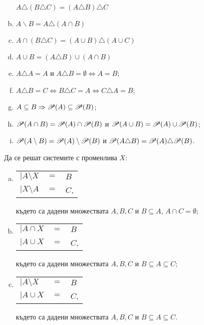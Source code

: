 \begin{problem}
\begin{enumerate}[a)]
    $A\triangle(B\triangle C) = (A\triangle B)\triangle C$
  \item
    $A\backslash B = A\triangle(A\cap B)$
  \item
    $A\cap(B\triangle C) = (A\cup B)\triangle(A\cup C)$
  \item
    $A\cup B = (A\triangle B)\cup(A\cap B)$
  \item
    $A\triangle A = A$ и $A\triangle B = \emptyset \iff A = B$;
  \item
    $A\triangle B = C \iff B\triangle C = A \iff C\triangle A = B$;
  \item 
    $A\subseteq B \Rightarrow \mathscr{P}(A) \subseteq \mathscr{P}(B)$;
  \item
    $\mathscr{P}(A\cap B) = \mathscr{P}(A) \cap \mathscr{P}(B)$ и $\mathscr{P}(A\cup B) = \mathscr{P}(A) \cup \mathscr{P}(B)$;
  \item
    $\mathscr{P}(A\setminus B) = \mathscr{P}(A)\setminus\mathscr{P}(B)$ и $\mathscr{P}(A\triangle B) = \mathscr{P}(A)\triangle \mathscr{P}(B)$.
  \end{enumerate}
\end{problem}

\begin{problem}
  Да се решат системите с променлива $X$:
  \begin{enumerate}[a)]
  \item
    \begin{tabular}{l c l}
      $\big|A\setminus X$ & $= $ & $ B$\\
      $\big|X\setminus A $ & $=$ & $ C$,
    \end{tabular}
    
    където са дадени множествата $A,B,C$ и $B\subseteq A$, $A\cap C = \emptyset$;
  \item
    \begin{tabular}{l c l}
      $\big|A\cap X$ & $= $ & $ B$\\
      $\big|A\cup X $ & $=$ & $ C$,
    \end{tabular}
    
    където са дадени множествата $A,B,C$ и $B\subseteq A\subseteq C$;
  \item
    \begin{tabular}{l c l}
      $\big|A\setminus X$ & $= $ & $ B$\\
      $\big|A\cup X $ & $=$ & $ C$,
    \end{tabular}

    където са дадени множествата $A,B,C$ и $B\subseteq A\subseteq C$.
  \end{enumerate}
\end{problem}

